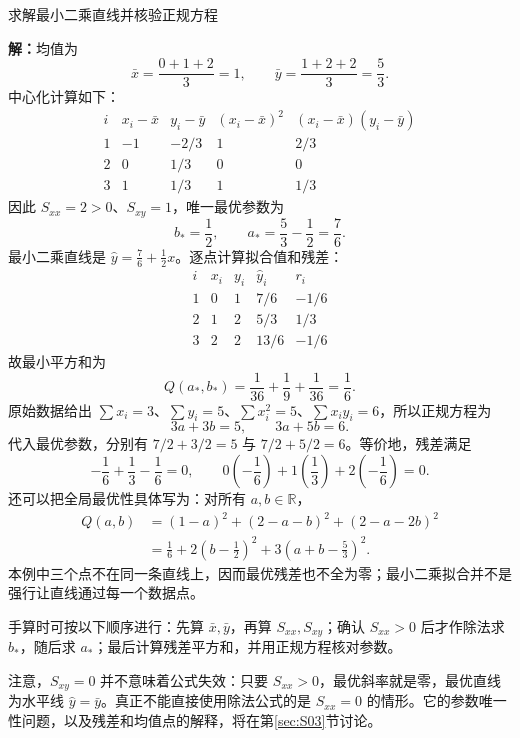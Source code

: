 \documentclass[aspectratio=169,10pt,fontset=fandol]{ctexbeamer}
\begin{document}
\begin{frame}[t,fragile]{求解最小二乘直线并核验正规方程}
\small
{\small
\par\noindent\textbf{解：}均值为
\[
\bar{x}=\frac{0+1+2}{3}=1,\qquad
\bar{y}=\frac{1+2+2}{3}=\frac53.
\]
中心化计算如下：
\[
\begin{array}{c|r|r|r|r}
i&x_i-\bar{x}&y_i-\bar{y}&(x_i-\bar{x})^2&(x_i-\bar{x})(y_i-\bar{y})\\ \hline
1&-1&-2/3&1&2/3\\
2&0&1/3&0&0\\
3&1&1/3&1&1/3
\end{array}
\]
因此 $S_{xx}=2>0$、$S_{xy}=1$，唯一最优参数为
\[
b_* =\frac12,\qquad a_* =\frac53-\frac12=\frac76.
\]
最小二乘直线是 $\hat{y}=\frac76+\frac12x$。逐点计算拟合值和残差：
\[
\begin{array}{c|r|r|r|r}
i&x_i&y_i&\hat{y}_i&r_i\\ \hline
1&0&1&7/6&-1/6\\
2&1&2&5/3&1/3\\
3&2&2&13/6&-1/6
\end{array}
\]
故最小平方和为
\[
Q(a_*,b_*)=\frac1{36}+\frac19+\frac1{36}=\frac16.
\]
原始数据给出 $\sum x_i=3$、$\sum y_i=5$、$\sum x_i^2=5$、$\sum x_i y_i=6$，所以正规方程为
\[
3a+3b=5,\qquad 3a+5b=6.
\]
代入最优参数，分别有 $7/2+3/2=5$ 与 $7/2+5/2=6$。等价地，残差满足
\[
-\frac16+\frac13-\frac16=0,\qquad
0\left(-\frac16\right)+1\left(\frac13\right)+2\left(-\frac16\right)=0.
\]
还可以把全局最优性具体写为：对所有 $a,b\in\mathbb{R}$，
\[
\begin{aligned}
Q(a,b)&=(1-a)^2+(2-a-b)^2+(2-a-2b)^2\\
&=\frac16+2\left(b-\frac12\right)^2+3\left(a+b-\frac53\right)^2.
\end{aligned}
\]
本例中三个点不在同一条直线上，因而最优残差也不全为零；最小二乘拟合并不是强行让直线通过每一个数据点。\par

}
{\small
手算时可按以下顺序进行：先算 $\bar{x},\bar{y}$，再算 $S_{xx},S_{xy}$；确认 $S_{xx}>0$ 后才作除法求 $b_*$，随后求 $a_*$；最后计算残差平方和，并用正规方程核对参数。


}
{\small
注意，$S_{xy}=0$ 并不意味着公式失效：只要 $S_{xx}>0$，最优斜率就是零，最优直线为水平线 $\hat{y}=\bar{y}$。真正不能直接使用除法公式的是 $S_{xx}=0$ 的情形。它的参数唯一性问题，以及残差和均值点的解释，将在第\ref{sec:S03}节讨论。\par

}
\end{frame}
\end{document}

